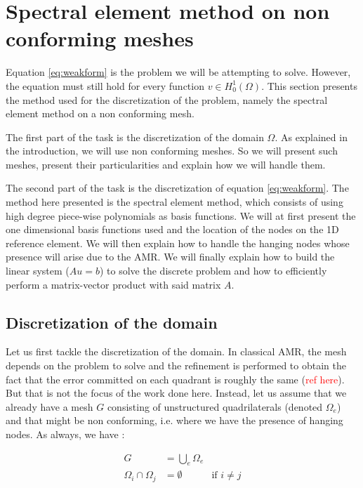 \section{Spectral element method on non conforming meshes}
Equation \ref{eq:weakform} is the problem we will be attempting to solve. However, the equation must still hold for every function $v \in H_0^1(\Omega)$. This section presents the method used for the discretization of the problem, namely the spectral element method on a non conforming mesh. 

The first part of the task is the discretization of the domain $\Omega$. As explained in the introduction, we will use non conforming meshes. So we will present such meshes, present their particularities and explain how we will handle them.   

The second part of the task is the discretization of equation \ref{eq:weakform}. The method here presented is the spectral element method, which consists of using high degree piece-wise polynomials as basis functions. We will at first present the one dimensional basis functions used and the location of the nodes on the 1D reference element. We will then explain how to handle the hanging nodes whose presence will arise due to the AMR. We will finally explain how to build the linear system ($Au= b$) to solve the discrete problem and how to efficiently perform a matrix-vector product with said matrix $A$.

\subsection{Discretization of the domain}

Let us first tackle the discretization of the domain. In classical AMR, the mesh depends on the problem to solve and the refinement is performed to obtain the fact that the error committed on each quadrant is roughly the same (\textcolor{red}{ref here}). But that is not the focus of the work done here. Instead, let us assume that we already have a mesh $G$ consisting of unstructured quadrilaterals (denoted $\Omega_e$) and that might be non conforming, i.e. where we have the presence of hanging nodes. As always, we have : 

\begin{align*}
G &= \bigcup\limits_{e} \Omega_e\\
\Omega_i \cap \Omega_j &= \emptyset &\text{if $i\neq j$}
\end{align*}

